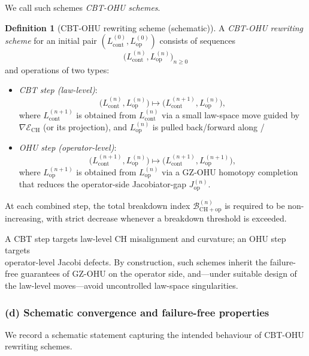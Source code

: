 \documentclass[11pt]{book}
\theoremstyle{plain}
\theoremstyle{definition}
\newtheorem{definition}[theorem]{Definition} \theoremstyle{remark}
\begin{document}
We call such schemes \emph{CBT-OHU schemes}.

\begin{definition}[CBT-OHU rewriting scheme (schematic)]
  A \emph{CBT-OHU rewriting scheme} for an initial pair
  $(L_{\mathrm{cont}}^{(0)},L_{\mathrm{op}}^{(0)})$ consists of
  sequences
  \[
    \bigl(L_{\mathrm{cont}}^{(n)},L_{\mathrm{op}}^{(n)}\bigr)_{n\ge0}
  \]
  and operations of two types:

  \begin{itemize}
    \item \emph{CBT step (law-level)}:
      \[
        \bigl(L_{\mathrm{cont}}^{(n)},L_{\mathrm{op}}^{(n)}\bigr)
        \mapsto
        \bigl(L_{\mathrm{cont}}^{(n+1)},L_{\mathrm{op}}^{(n)}\bigr),
      \]
      where $L_{\mathrm{cont}}^{(n+1)}$ is obtained from
      $L_{\mathrm{cont}}^{(n)}$ via a small law-space move guided by
      $\nabla\mathcal{E}_{\mathrm{CH}}$ (or its projection), and
      $L_{\mathrm{op}}^{(n)}$ is pulled back/forward along \GZLOC/\GZTLC\;
      \item \emph{OHU step (operator-level)}:
      \[
        \bigl(L_{\mathrm{cont}}^{(n+1)},L_{\mathrm{op}}^{(n)}\bigr)
        \mapsto
        \bigl(L_{\mathrm{cont}}^{(n+1)},L_{\mathrm{op}}^{(n+1)}\bigr),
      \]
      where $L_{\mathrm{op}}^{(n+1)}$ is obtained from
      $L_{\mathrm{op}}^{(n)}$ via a GZ-OHU homotopy completion that
      reduces the operator-side Jacobiator-gap
      $J_{\mathrm{op}}^{(n)}$.
  \end{itemize}

  At each combined step, the total breakdown index
  $\mathcal{B}_{\mathrm{CH+op}}^{(n)}$ is required to be non-increasing,
  with strict decrease whenever a breakdown threshold is exceeded.
\end{definition}

A CBT step targets law-level CH misalignment and curvature; an OHU
step targets \\ operator-level Jacobi defects. By construction, such
schemes inherit the failure-free guarantees of GZ-OHU on the operator
side, and—under suitable design of the law-level moves—avoid
uncontrolled law-space singularities.



\subsubsection*{(d) Schematic convergence and failure-free properties}

We record a schematic statement capturing the intended behaviour of
CBT-OHU rewriting schemes.
\end{document}
